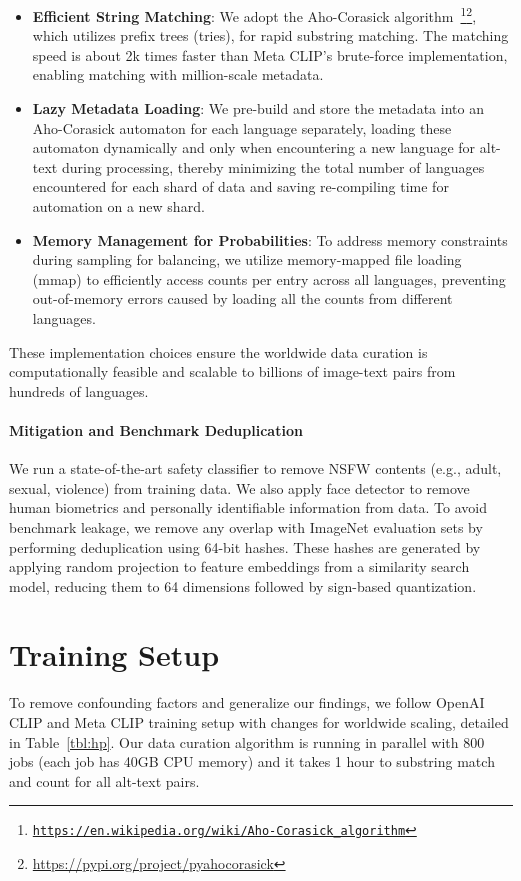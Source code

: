 \begin{itemize}
    \item \textbf{Efficient String Matching}: We adopt the Aho-Corasick algorithm~\footnote{\href{https://en.wikipedia.org/wiki/Aho-Corasick_algorithm}{\tt https://en.wikipedia.org/wiki/Aho-Corasick\_algorithm}}\footnote{\url{https://pypi.org/project/pyahocorasick}}, which utilizes prefix trees (tries), for rapid substring matching. The matching speed is about 2k times faster than Meta CLIP's brute-force implementation, enabling matching with million-scale metadata.
    \item \textbf{Lazy Metadata Loading}: We pre-build and store the metadata into an Aho-Corasick automaton for each language separately, loading these automaton dynamically and only when encountering a new language for alt-text during processing, thereby minimizing the total number of languages encountered for each shard of data and saving re-compiling time for automation on a new shard.
    \item \textbf{Memory Management for Probabilities}: To address memory constraints during sampling for balancing, we utilize memory-mapped file loading (mmap) to efficiently access counts per entry across all languages, preventing out-of-memory errors caused by loading all the counts from different languages.
\end{itemize}

These implementation choices ensure the worldwide data curation is computationally feasible and scalable to billions of image-text pairs from hundreds of languages. 

\paragraph{Mitigation and Benchmark Deduplication} We run a state-of-the-art safety classifier to remove NSFW contents (e.g., adult, sexual, violence) from training data. We also apply face detector to remove human biometrics and personally identifiable information from data. To avoid benchmark leakage, we remove any overlap with ImageNet evaluation sets by performing deduplication using 64-bit hashes. These hashes are generated by applying random projection to feature embeddings from a similarity search model, reducing them to 64 dimensions followed by sign-based quantization.

\section{Training Setup}
\label{sec:training_setup}
To remove confounding factors and generalize our findings, we follow OpenAI CLIP and Meta CLIP training setup with changes for worldwide scaling, detailed in Table~\ref{tbl:hp}.  
Our data curation algorithm is running in parallel with 800 jobs (each job has 40GB CPU memory) and it takes 1 hour to substring match and count for all alt-text pairs.

